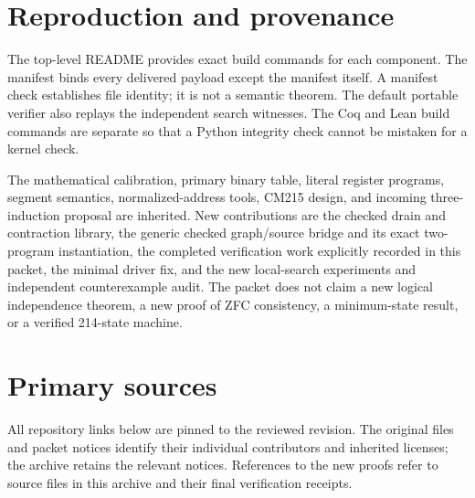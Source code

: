 \documentclass[11pt,letterpaper]{article}
\theoremstyle{definition}\newtheorem{definition}[theorem]{Definition}
\begin{document}
\section{Reproduction and provenance}

The top-level README provides exact build commands for each component. The
manifest binds every delivered payload except the manifest itself. A manifest
check establishes file identity; it is not a semantic theorem. The default
portable verifier also replays the independent search witnesses. The Coq and
Lean build commands are separate so that a Python integrity check cannot be
mistaken for a kernel check.

The mathematical calibration, primary binary table, literal register programs,
segment semantics, normalized-address tools, CM215 design, and incoming
three-induction proposal are inherited. New contributions are the checked drain
and contraction library, the generic checked graph/source bridge and its exact
two-program instantiation, the completed verification work explicitly recorded
in this packet, the minimal driver fix, and the new local-search experiments
and independent counterexample audit. The packet does not claim a new logical
independence theorem, a new proof of ZFC consistency, a minimum-state result,
or a verified 214-state machine.

\clearpage
\section{Primary sources}\label{sec:references}

All repository links below are pinned to the reviewed revision. The original
files and packet notices identify their individual contributors and inherited
licenses; the archive retains the relevant notices. References to the new
proofs refer to source files in this archive and their final verification
receipts.
\end{document}
